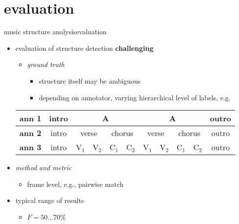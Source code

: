     \section[evaluation]{evaluation}
        \begin{frame}{music structure analysis}{evaluation}
            \begin{itemize}
                \item   evaluation of structure detection \textbf{challenging}
                    \begin{itemize}
                        \item   \textit{ground truth}
                            \begin{itemize}
                                \item   structure itself may be ambiguous
                                \item   depending on annotator, varying hierarchical level of labels, e.g.
                            \end{itemize}
                    \end{itemize}
                    \begin{table}
                        \centering
                        \footnotesize
                            \begin{tabular}{l|c|c|c|c|c|c|c|c|c|c|}
                                    \hline
                                  \textbf{ann 1} & intro & \multicolumn{4}{c|}{A} & \multicolumn{4}{c|}{A} & outro\\ \hline
                                  \textbf{ann 2} & intro & \multicolumn{2}{c|}{verse} & \multicolumn{2}{c|}{chorus} & \multicolumn{2}{c|}{verse} & \multicolumn{2}{c|}{chorus} & outro\\ \hline
                                  \textbf{ann 3} & intro & V$_1$ & V$_2$ & C$_1$ &C$_2$ &  V$_1$ & V$_2$ & C$_1$ &C$_2$ & outro\\
                                    \hline
                            \end{tabular}
                    \end{table}
                \bigskip
                \item<2->   \textit{method and metric}
                    \begin{itemize}
                        \item   frame level, e.g., pairwise match
                    \end{itemize}
                \bigskip
                \item<3->   typical range of results
                    \begin{itemize}
                        \item   $F = 50\ldots 70\% $
                    \end{itemize}
            \end{itemize}
        \end{frame}
    
